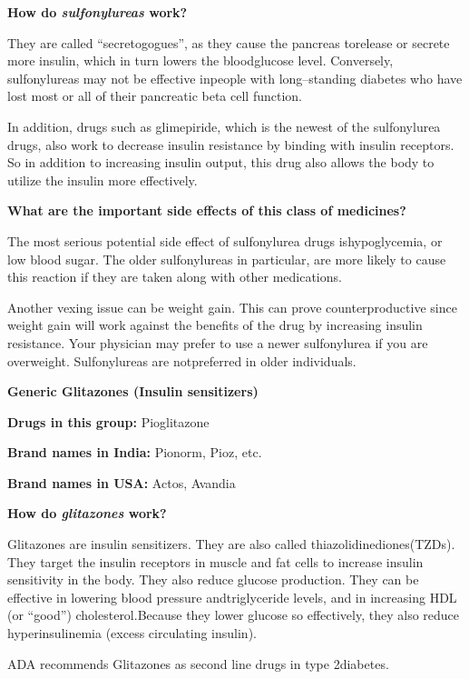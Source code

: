 \noindent\textbf{How do \textit{sulfonylureas} work?}

They are called “secretogogues”, as they cause the pancreas to\break release or secrete more insulin, which in turn lowers the blood\break glucose level. Conversely, sulfonylureas may not be effective in\break people with long–standing diabetes who have lost most or all of their pancreatic beta cell function.

In addition, drugs such as glimepiride, which is the newest of the sulfonylurea drugs, also work to decrease insulin resistance by binding with insulin receptors. So in addition to increasing insulin output, this drug also allows the body to utilize the insulin more effectively.

\noindent\textbf{What are the important side effects of this class of medicines?}

The most serious potential side effect of sulfonylurea drugs is\break hypoglycemia, or low blood sugar. The older sulfonylureas in parti\-cular, are more likely to cause this reaction if they are taken along with other medications.

Another vexing issue can be weight gain. This can prove counterproductive since weight gain will work against the benefits of the drug by increasing insulin resistance. Your physician may prefer to use a newer sulfonylurea if you are overweight. Sulfonylureas are not\break preferred in older individuals.

\vskip 6pt

\textbf{Generic Glitazones (Insulin sensitizers)}

\textbf{Drugs in this group:} Pioglitazone

\textbf{Brand names in India:} Pionorm, Pioz, etc.

\textbf{Brand names in USA:} Actos, Avandia

\noindent\textbf{How do \textit{glitazones} work?}

Glitazones are insulin sensitizers. They are also called thiazolidinediones(TZDs). They target the insulin receptors in muscle and fat cells to increase insulin sensitivity in the body. They also reduce glucose production. They can be effective in lowering blood pressure and\break triglyceride levels, and in increasing HDL (or “good”) cholesterol.\break Because they lower glucose so effectively, they also reduce hyper\-insu\-linemia (excess circulating insulin).

ADA recommends Glitazones as second line drugs in type 2\break diabetes.

